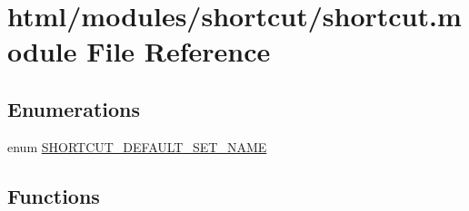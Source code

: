 \hypertarget{shortcut_8module}{
\section{html/modules/shortcut/shortcut.module File Reference}
\label{shortcut_8module}
}
\subsection*{Enumerations}
\begin{DoxyCompactItemize}
\item 
enum \hyperlink{shortcut_8module_ab0a3fec294263172ae0acd5917ee2247}{SHORTCUT\_\-DEFAULT\_\-SET\_\-NAME} 
\end{DoxyCompactItemize}
\subsection*{Functions}
